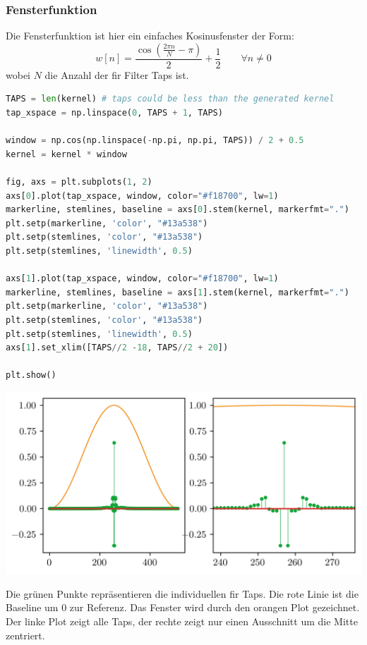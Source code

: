 \hypertarget{fensterfunktion}{%
\subsubsection{Fensterfunktion}\label{fensterfunktion}}

Die Fensterfunktion ist hier ein einfaches Kosinusfenster der Form:
\[w[n] = \frac{\cos \left( \frac{2\pi n}{N}-\pi \right)}{2} + \frac{1}{2} \qquad \forall n \neq 0\]
wobei \(N\) die Anzahl der \gls{fir} Filter Taps ist.

\begin{lstlisting}[language=Python]
TAPS = len(kernel) # taps could be less than the generated kernel
tap_xspace = np.linspace(0, TAPS + 1, TAPS)

window = np.cos(np.linspace(-np.pi, np.pi, TAPS)) / 2 + 0.5
kernel = kernel * window

fig, axs = plt.subplots(1, 2)
axs[0].plot(tap_xspace, window, color="#f18700", lw=1)
markerline, stemlines, baseline = axs[0].stem(kernel, markerfmt=".")
plt.setp(markerline, 'color', "#13a538")
plt.setp(stemlines, 'color', "#13a538")
plt.setp(stemlines, 'linewidth', 0.5)

axs[1].plot(tap_xspace, window, color="#f18700", lw=1)
markerline, stemlines, baseline = axs[1].stem(kernel, markerfmt=".")
plt.setp(markerline, 'color', "#13a538")
plt.setp(stemlines, 'color', "#13a538")
plt.setp(stemlines, 'linewidth', 0.5)
axs[1].set_xlim([TAPS//2 -18, TAPS//2 + 20])

plt.show()
\end{lstlisting}

\includegraphics{./img/242aea9dbf6c58987e03c8555202b017345941e0.png}

Die grünen Punkte repräsentieren die individuellen \gls{fir} Taps. Die
rote Linie ist die Baseline um 0 zur Referenz. Das Fenster wird durch
den orangen Plot gezeichnet. Der linke Plot zeigt alle Taps, der rechte
zeigt nur einen Ausschnitt um die Mitte zentriert.

